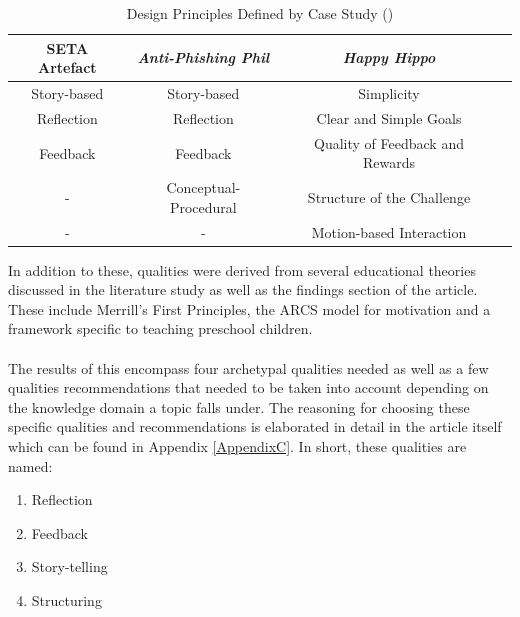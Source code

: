 \begin{table}[H]
\caption{Design Principles Defined by Case Study (\cite{Dincelli2020,Sheng2007,allers2021children})}
\begin{center}
\begin{tabular}{|c|c|c|c|}
\hline

\textbf{SETA Artefact} & \textbf{\textit{Anti-Phishing Phil}}& \textbf{\textit{Happy Hippo}} \\
\hline
Story-based	& Story-based 			& Simplicity  \\
Reflection	& Reflection			& Clear and Simple Goals  \\
Feedback	& Feedback 				& Quality of Feedback and Rewards  \\
	-		& Conceptual-Procedural	& Structure of the Challenge  \\
	-		& 		-				& Motion-based Interaction  \\
\hline

\end{tabular}
\label{tab4.1}
\end{center}
\end{table}

\noindent In addition to these, qualities were derived from several educational theories discussed in the literature study as well as the findings section of the article. These include Merrill's First Principles, the ARCS model for motivation and a framework specific to teaching preschool children.
\\\\
The results of this encompass four archetypal qualities needed as well as a few qualities recommendations that needed to be taken into account depending on the knowledge domain a topic falls under. The reasoning for choosing these specific qualities and recommendations is elaborated in detail in the article itself which can be found in Appendix \ref{AppendixC}. In short, these qualities are named:
\begin{enumerate}
\item Reflection
\item Feedback
\item Story-telling
\item Structuring
\end{enumerate}


